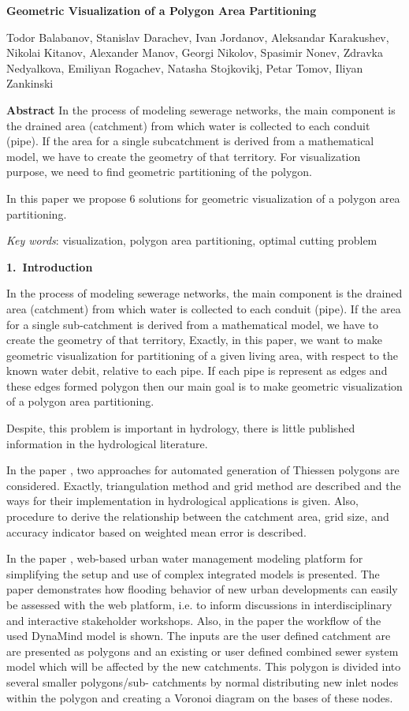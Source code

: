 \documentclass[11pt,leqno]{book}
\newcommand{\sect}[1]{\vskip7mm\par{\large \bf #1}}
\begin{document}
%
\begin{center}
\textbf{\LARGE Geometric Visualization of a Polygon Area Partitioning}

\vspace*{5mm}
%
Todor Balabanov,
Stanislav Darachev,
Ivan Jordanov,
Aleksandar Karakushev,
Nikolai Kitanov,
Alexander Manov,
Georgi Nikolov,
Spasimir Nonev,
Zdravka Nedyalkova,
Emiliyan Rogachev,
Natasha Stojkovikj,
Petar Tomov,
Iliyan Zankinski
%
\end{center}
%
\date{18-22 Sep 2017}
%
\sect{Abstract}
%
In the process of modeling sewerage networks, the main component is the drained area (catchment) from which water is collected to each conduit (pipe). If the area for a single subcatchment is derived from a mathematical model, we have to create the geometry of that territory. For visualization purpose, we need to find geometric partitioning of the polygon.

In this paper we propose 6 solutions for geometric visualization of a polygon area partitioning.

\textit{Key words}: visualization, polygon area partitioning, optimal cutting problem

\sect{1.~Introduction}

In the process of modeling sewerage networks, the main component is the drained area (catchment) from which water is collected to each conduit (pipe). If the area for a single sub-catchment is derived from a mathematical model, we have to create the geometry of that territory, Exactly, in this paper, we want to make geometric visualization for partitioning of a given living area, with respect to the known water debit, relative to each pipe. If each pipe is represent as edges and these edges formed polygon  then our main goal is to make geometric visualization of a polygon area partitioning.  

Despite, this problem is important in hydrology, there is little published information in the hydrological literature. 

In the paper \cite{1}, two approaches for automated generation of  Thiessen polygons are considered. Exactly, triangulation method and grid method are described and the ways for their implementation in hydrological applications is given. Also, procedure to derive the relationship between the catchment area, grid size, and accuracy indicator based on weighted mean error is described. 

In the paper \cite{2}, web-based urban water management modeling platform for simplifying the setup and use of complex integrated models is presented.  The paper demonstrates how flooding behavior of new urban developments can easily be assessed with the web platform, i.e. to inform discussions in interdisciplinary and interactive stakeholder workshops.  Also, in the paper the workﬂow of the used DynaMind model is shown. The inputs are the user deﬁned catchment are are presented as polygons and an existing or user deﬁned combined sewer system model which will be affected by the new catchments. This polygon is divided into several smaller polygons/sub- catchments by normal distributing new inlet nodes within the polygon and creating a Voronoi diagram on the bases of these nodes. 
\end{document}
